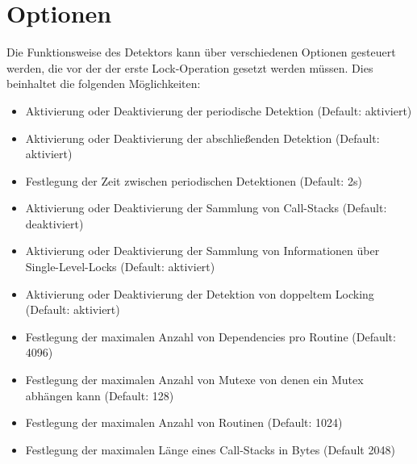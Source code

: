 \section{Optionen}
Die Funktionsweise des Detektors kann über verschiedenen Optionen gesteuert
werden, die vor der der erste Lock-Operation gesetzt werden müssen.
Dies beinhaltet die folgenden Möglichkeiten:
\begin{itemize}
  \item Aktivierung oder Deaktivierung der periodische Detektion (Default: aktiviert)
  \item Aktivierung oder Deaktivierung der abschließenden Detektion (Default: aktiviert)
  \item Festlegung der Zeit zwischen periodischen Detektionen (Default: 2s)
  \item Aktivierung oder Deaktivierung der Sammlung von Call-Stacks (Default: deaktiviert)
  \item Aktivierung oder Deaktivierung der Sammlung von Informationen über Single-Level-Locks (Default: aktiviert)
  \item Aktivierung oder Deaktivierung der Detektion von doppeltem Locking (Default: aktiviert)
  \item Festlegung der maximalen Anzahl von Dependencies pro Routine (Default: 4096)
  \item Festlegung der maximalen Anzahl von Mutexe von denen ein Mutex abhängen kann (Default: 128)
  \item Festlegung der maximalen Anzahl von Routinen (Default: 1024)
  \item Festlegung der maximalen Länge eines Call-Stacks in Bytes (Default 2048)
\end{itemize}

\newpage